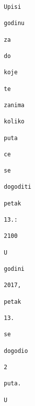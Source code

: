 \documentclass{exam}
\begin{document}
\begin{itemize}
\begin{lstlisting}[caption={Ispis}]
                                                                                                    Upisi
                                                                                                    godinu
                                                                                                    za
                                                                                                    do
                                                                                                    koje
                                                                                                    te
                                                                                                    zanima
                                                                                                    koliko
                                                                                                    puta
                                                                                                    ce
                                                                                                    se
                                                                                                    dogoditi
                                                                                                    petak
                                                                                                    13.:
                                                                                                    2100
                                                                                                    U
                                                                                                    godini
                                                                                                    2017,
                                                                                                    petak
                                                                                                    13.
                                                                                                    se
                                                                                                    dogodio
                                                                                                    2
                                                                                                    puta.
                                                                                                    U

\end{lstlisting}
\end{itemize}
\end{document}
